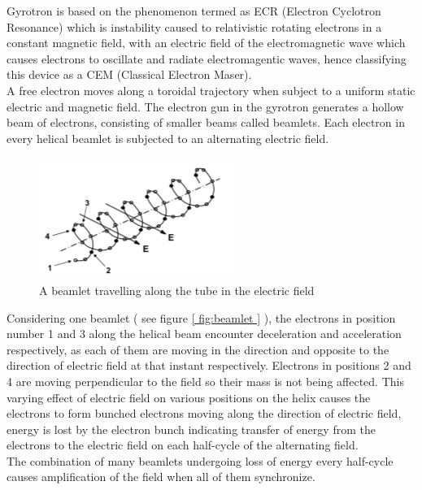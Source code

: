 Gyrotron is based on the phenomenon termed as ECR (Electron Cyclotron Resonance) which is instability caused to relativistic rotating electrons in a constant magnetic field, with an electric field of the electromagnetic wave which causes electrons to oscillate and radiate electromagentic waves, hence classifying this device as a CEM (Classical Electron Maser).\\

A free electron moves along a toroidal trajectory when subject to a uniform static electric and magnetic field. The electron gun in the gyrotron generates a hollow beam of electrons, consisting of smaller beams called beamlets. Each electron in every helical beamlet is subjected to an alternating electric field.\\

\begin{figure}
\centering
\includegraphics{./images/beamlet}
\caption{A beamlet travelling along the tube in the electric field}
\label{fig:beamlet}
\end{figure}

Considering one beamlet ( see figure \ref{ fig:beamlet } ), the electrons in position number 1 and 3 along the helical beam encounter deceleration and acceleration respectively, as each of them are moving in the direction and opposite to the direction of  electric field at that instant respectively. Electrons in positions 2 and 4 are moving perpendicular to the field so their mass is not being affected. This varying effect of electric field on various positions on the helix causes the electrons to form bunched electrons moving along the direction of electric field, energy is lost by the electron bunch indicating transfer of energy from the electrons to the electric field on each half-cycle of the alternating field.\\

The combination of many beamlets undergoing loss of energy every half-cycle causes amplification of the field when all of them synchronize.
